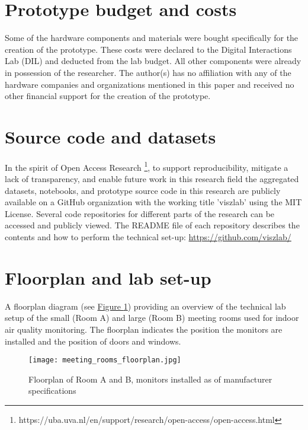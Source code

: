 \begin{appendices}
\section{Prototype budget and costs}
\label{appendix:ethical}

Some of the hardware components and materials were bought specifically for the creation of the prototype. These costs were declared to the Digital Interactions Lab (DIL) and deducted from the lab budget. All other components were already in possession of the researcher. The author(s) has no affiliation with any of the hardware companies and organizations mentioned in this paper and received no other financial support for the creation of the prototype.

\section{Source code and datasets}
\label{appendix:source}

In the spirit of Open Access Research \footnote{https://uba.uva.nl/en/support/research/open-access/open-access.html}, to support reproducibility, mitigate a lack of transparency, and enable future work in this research field the aggregated datasets, notebooks, and prototype source code in this research are publicly available on a GitHub organization with the working title 'viszlab' using the MIT License. Several code repositories for different parts of the research can be accessed and publicly viewed. The README file of each repository describes the contents and how to perform the technical set-up: \underline{https://github.com/viszlab/}

\pagebreak

\section{Floorplan and lab set-up}
\label{appendix:floorplan}

A floorplan diagram (see \hyperref[fig:floorplan]{Figure \ref{fig:floorplan}}) providing an overview of the technical lab setup of the small (Room A) and large (Room B) meeting rooms used for indoor air quality monitoring. The floorplan indicates the position the monitors are installed and the position of doors and windows.

\begin{figure}[H]
    \centering
    \texttt{[image: meeting\_rooms\_floorplan.jpg]}
    \caption{Floorplan of Room A and B, monitors installed as of manufacturer specifications}
    \label{fig:floorplan}
\end{figure}


\end{appendices}
